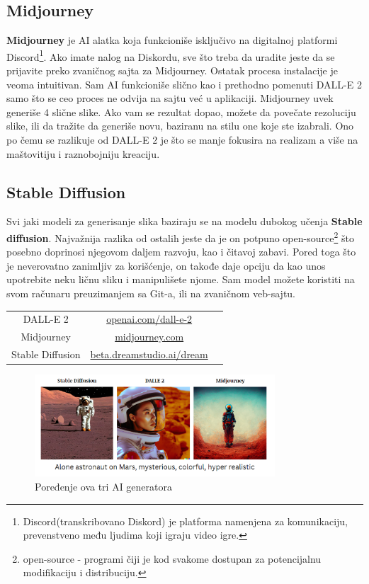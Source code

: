 \documentclass[12pt, letterpaper]{article}
\begin{document}
\subsection{Midjourney}
\textbf{Midjourney} je AI alatka koja funkcioniše isključivo na digitalnoj platformi Discord\footnote{Discord(transkribovano Diskord) je platforma namenjena za komunikaciju, prevenstveno među ljudima koji igraju video igre.}. Ako imate nalog na Diskordu, sve što treba da uradite jeste da se prijavite preko zvaničnog sajta za Midjourney. Ostatak procesa instalacije je veoma intuitivan. Sam  AI funkcioniše slično kao i prethodno pomenuti DALL-E 2 samo što se ceo proces ne odvija na sajtu već u aplikaciji. Midjourney uvek generiše 4 slične slike. Ako vam se rezultat dopao, možete da povečate rezoluciju slike, ili da tražite da generiše novu, baziranu na stilu one koje ste izabrali. Ono po čemu se razlikuje od DALL-E 2 je što se manje fokusira na realizam a više na maštovitiju i raznobojniju kreaciju.
\subsection{Stable Diffusion}
Svi jaki modeli za generisanje slika baziraju se na modelu dubokog učenja \textbf{Stable diffusion}. Najvažnija razlika od ostalih jeste da je on potpuno open-source\footnote{open-source - programi čiji je kod svakome dostupan za potencijalnu modifikaciju i distribuciju.} što posebno doprinosi njegovom daljem razvoju, kao i čitavoj zabavi. Pored toga što je neverovatno zanimljiv za korišćenje, on takođe daje opciju da kao unos upotrebite neku ličnu sliku i manipulišete njome. Sam model možete koristiti na svom računaru preuzimanjem sa Git-a, ili na zvaničnom veb-sajtu.
\begin{center}
\begin{tabular}{ |c|c|c| } 
 \hline
 DALL-E 2 & \href{https://openai.com/dall-e-2/}{openai.com/dall-e-2} \\
 Midjourney & \href{https://www.midjourney.com/}{midjourney.com} \\
 Stable Diffusion & \href{https://beta.dreamstudio.ai/dream}{beta.dreamstudio.ai/dream} \\
 \hline
\end{tabular}
\end{center}

\begin{figure}[htp]
\centering
\includegraphics[width=0.8\textwidth]{astronaut.png}
\caption{Poređenje ova tri AI generatora}
\label{fig: Astronaut}
\end{figure}
 
\end{document}
